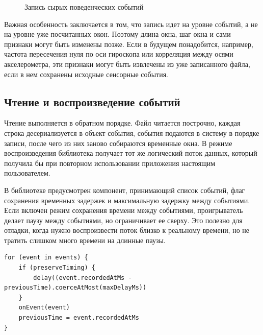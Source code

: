 \documentclass[oneside,senior,etd]{BYUPhys}
\begin{document}
\begin{figure}[ht]
\centering
{}
\caption{Запись сырых поведенческих событий}
\label{fig:recording}
\end{figure}

Важная особенность заключается в том, что запись идет на уровне событий, а не на уровне уже посчитанных окон. Поэтому длина окна, шаг окна и сами признаки могут быть изменены позже. Если в будущем понадобится, например, частота пересечения нуля по оси гироскопа или корреляция между осями акселерометра, эти признаки могут быть извлечены из уже записанного файла, если в нем сохранены исходные сенсорные события.

\subsection{Чтение и воспроизведение событий}

Чтение выполняется в обратном порядке. Файл читается построчно, каждая строка десериализуется в объект события, события подаются в систему в порядке записи, после чего из них заново собираются временные окна. В режиме воспроизведения библиотека получает тот же логический поток данных, который получила бы при повторном использовании приложения настоящим пользователем.

В библиотеке предусмотрен компонент, принимающий список событий, флаг сохранения временных задержек и максимальную задержку между событиями. Если включен режим сохранения времени между событиями, проигрыватель делает паузу между событиями, но ограничивает ее сверху. Это полезно для отладки, когда нужно воспроизвести поток близко к реальному времени, но не тратить слишком много времени на длинные паузы.

\begin{lstlisting}[caption={Схема воспроизведения событий},label={lst:replay}]
for (event in events) {
    if (preserveTiming) {
        delay((event.recordedAtMs - previousTime).coerceAtMost(maxDelayMs))
    }
    onEvent(event)
    previousTime = event.recordedAtMs
}
\end{lstlisting}
\end{document}
